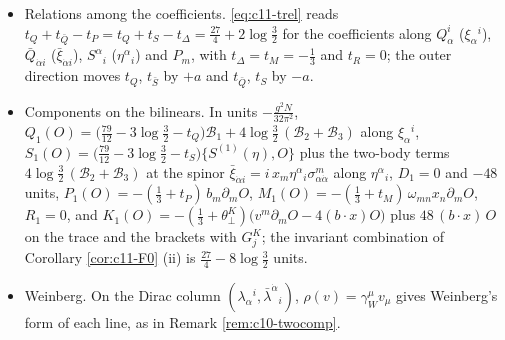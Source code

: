 \begin{remark}
\begin{itemize}
\item Relations among the coefficients. \eqref{eq:c11-trel} reads $t_{Q}+t_{\bar Q}-t_P=t_Q+t_{S}-t_\Delta=\tfrac{27}4+2\log\tfrac32$ for the coefficients along $Q^i_\alpha$ ($\xi_\alpha{}^i$), $\bar Q_{\dot\alpha i}$ ($\bar\xi_{\dot\alpha i}$), $S^\alpha{}_i$ ($\eta^\alpha{}_i$) and $P_m$, with $t_\Delta=t_M=-\tfrac13$ and $t_R=0$; the outer direction moves $t_Q$, $t_{\bar S}$ by $+a$ and $t_{\bar Q}$, $t_S$ by $-a$.
\item Components on the bilinears. In units $-\frac{g^2N}{32\pi^2}$, $Q_1(O)=\big(\tfrac{79}{12}-3\log\tfrac32-t_Q\big)\mathcal B_1+4\log\tfrac32\,(\mathcal B_2+\mathcal B_3)$ along $\xi_\alpha{}^i$, $S_1(O)=\big(\tfrac{79}{12}-3\log\tfrac32-t_S\big)\{S^{(1)}(\eta),O\}$ plus the two-body terms $4\log\tfrac32\,(\mathcal B_2+\mathcal B_3)$ at the spinor $\bar\xi_{\dot\alpha i}=i\,x_m\eta^\alpha{}_i\sigma^m_{\alpha\dot\alpha}$ along $\eta^\alpha{}_i$, $D_1=0$ and $-48$ units, $P_1(O)=-(\tfrac13+t_P)\,b_m\partial_mO$, $M_1(O)=-(\tfrac13+t_M)\,\omega_{mn}x_n\partial_mO$, $R_1=0$, and $K_1(O)=-(\tfrac13+\theta^K_\perp)\big(v^m\partial_mO-4(b\cdot x)O\big)$ plus $48\,(b\cdot x)\,O$ on the trace and the brackets with $G^K_j$; the invariant combination of Corollary \ref{cor:c11-F0} (ii) is $\tfrac{27}4-8\log\tfrac32$ units.
\item Weinberg. On the Dirac column $(\lambda_\alpha{}^i,\bar\lambda^{\dot\alpha}{}_i)$, $\rho(v)=\gamma_W^\mu v_\mu$ gives Weinberg's form of each line, as in Remark \ref{rem:c10-twocomp}.
\end{itemize}
\end{remark}
